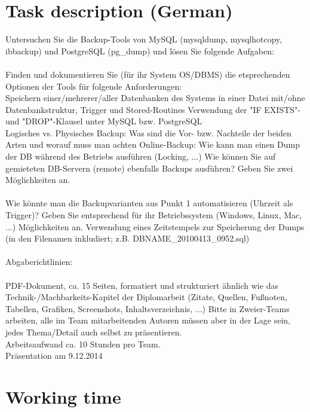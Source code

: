 \documentclass[10pt]{article}
\begin{document}
\ohead{\headmark}
\ofoot{\pagemark}
\tableofcontents
\section{Task description (German)}
Untersuchen Sie die Backup-Tools von MySQL (mysqldump, mysqlhotcopy, ibbackup) und PostgreSQL (pg\_dump) und lösen Sie folgende Aufgaben:
\\ \\
Finden und dokumentieren Sie (für ihr System OS/DBMS) die etsprechenden Optionen der Tools für folgende Anforderungen: \\
Speichern einer/mehrerer/aller Datenbanken des Systems in einer Datei mit/ohne Datenbankstruktur, Trigger und Stored-Routines 
Verwendung der "IF EXISTS"- und "DROP"-Klausel unter MySQL bzw. PostgreSQL \\
Logisches vs. Physisches Backup: Was sind die Vor- bzw. Nachteile der beiden Arten und worauf muss man achten
Online-Backup: Wie kann man einen Dump der DB während des Betriebs ausführen (Locking, ...)
Wie können Sie auf gemieteten DB-Servern (remote) ebenfalls Backups ausführen? Geben Sie zwei Möglichkeiten an.
\\ \\
Wie könnte man die Backupvarianten aus Punkt 1 automatisieren (Uhrzeit als Trigger)? Geben Sie entsprechend für ihr Betriebssystem (Windows, Linux, Mac, ...) Möglichkeiten an.
Verwendung eines Zeitstempels zur Speicherung der Dumps (in den Filenamen inkludiert; z.B. DBNAME\_20100413\_0952.sql)
\\ \\
Abgaberichtlinien:
 \\ \\
PDF-Dokument, ca. 15 Seiten, formatiert und strukturiert ähnlich wie das Technik-/Machbarkeits-Kapitel der Diplomarbeit (Zitate, Quellen, Fußnoten, Tabellen, Grafiken, Screenshots, Inhaltsverzeichnis, ...)
Bitte in Zweier-Teams arbeiten, alle im Team mitarbeitenden Autoren müssen aber in der Lage sein, jedes Thema/Detail auch selbst zu präsentieren. \\
Arbeitsaufwand ca. 10 Stunden pro Team.  \\
Präsentation am 9.12.2014

\section{Working time}
\end{document}
